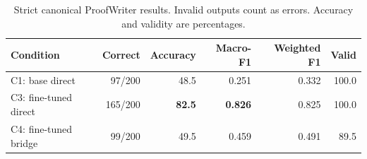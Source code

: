 \begin{table}[t]
\caption{Strict canonical ProofWriter results. Invalid outputs count as errors. Accuracy and validity are percentages.}
\label{tab:overall}
\centering
\small
\begin{tabular}{lrrrrr}
\toprule
Condition & Correct & Accuracy & Macro-F1 & Weighted F1 & Valid \\
\midrule
C1: base direct & 97/200 & 48.5 & 0.251 & 0.332 & 100.0 \\
C3: fine-tuned direct & 165/200 & \textbf{82.5} & \textbf{0.826} & 0.825 & 100.0 \\
C4: fine-tuned bridge & 99/200 & 49.5 & 0.459 & 0.491 & 89.5 \\
\bottomrule
\end{tabular}
\end{table}
